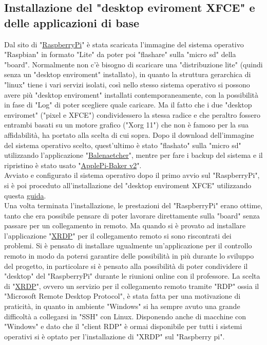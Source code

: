 \subsection{Installazione del "desktop eviroment XFCE" e delle applicazioni di base}
Dal sito di "\href{https://www.raspberrypi.com/software/operating-systems/}{RaspberryPi}" è stata scaricata l'immagine del sistema operativo "Raspbian" in formato "Lite" da poter poi "flashare" sulla "micro sd" della "board".  Normalmente non c'è bisogno di scaricare una "distribuzione lite" (quindi senza un "desktop enviroment" installato), in quanto la struttura gerarchica di "linux" tiene i vari servizi isolati, così nello stesso sistema operativo si possono avere più "desktop enviroment" installati contemporaneamente, con la possibilità in fase di "Log" di poter scegliere quale caricare. Ma il fatto che i due "desktop enviromet" ("pixel e XFCE") condividessero la stessa radice e che peraltro fossero entrambi basati su un motore grafico ("Xorg 11") che non è famoso per la sua affidabilità, ha portato alla scelta di cui sopra. 
Dopo il download dell'immagine del sistema operativo scelto, quest'ultimo è stato "flashato" sulla "micro sd" utilizzando l'applicazione "\href{https://etcher.balena.io/}{Balenaetcher}", mentre per fare i backup del sistema e il ripristino è stato usato "\href{https://www.tweaking4all.com/software/macosx-software/applepi-baker-v2/}{ApplePi-Baker v2}". \\
Avviato e configurato il sistema operativo dopo il primo avvio sul "RaspberryPi", si è poi proceduto all'installazione del "desktop enviroment XFCE" utilizzando questa \href{https://www.makeuseof.com/desktop-environments-you-can-run-on-a-raspberry-pi/}{guida}.\\
Una volta terminata l'installazione, le prestazioni del "RaspberryPi" erano ottime, tanto che era possibile pensare di poter lavorare direttamente sulla "board" senza passare per un collegamento in remoto. Ma quando si è provato ad installare l'applicazione "\href{https://github.com/neutrinolabs/xrdp}{XRDP}" per il collegamento remoto si sono riscontrati dei problemi. Si è pensato di installare ugualmente un'applicazione per il controllo remoto in modo da potersi garantire delle possibilità in più durante lo sviluppo del progetto, in particolare si è pensato alla possibilità di poter condividere il "desktop" del "RaspberryPi" durante le riunioni online con il professore. La scelta di "\href{https://github.com/neutrinolabs/xrdp}{XRDP}", ovvero un servizio per il collegamento remoto tramite "RDP" ossia il "Microsoft Remote Desktop Protocol", è stata fatta per una motivazione di praticità, in quanto in ambiente "Windows" si ha sempre avuto una grande difficoltà a collegarsi in "SSH" con Linux. Disponendo anche di macchine con "Windows" e dato che il "client RDP" è ormai disponibile per tutti i sistemi operativi si è optato per l'installazione di "XRDP" sul "Raspberry pi".\\
